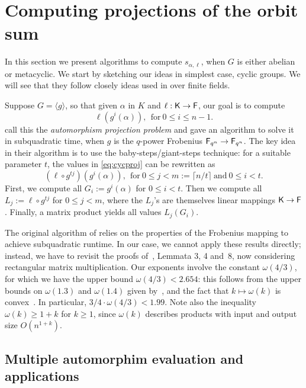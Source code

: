 \section{Computing projections of the orbit sum}
\label{sec:osum}

In this section we present algorithms to compute $s_{\alpha,\ell}$,
when $G$ is either abelian or metacyclic. We start by sketching our
ideas in simplest case, cyclic groups.  We will see that they follow
closely ideas used in \cite{KalSho98} over finite fields.

Suppose $G = \langle g \rangle$, so that given $\alpha$ in $K$ and
$\ell: {\mathsf{K}} \to {\mathsf{F}}$, our goal is to compute
\begin{equation}
  \label{eq:cycproj}
  \ell(g^i(\alpha)), ~~\mbox{for}~ 0\leq i\leq n-1.
\end{equation}
 call this the \emph{automorphism projection problem} and
gave an algorithm to solve it in subquadratic time, when $g$ is the
$q$-power Frobenius ${\mathsf{F}}_{q^n} \to {\mathsf{F}}_{q^n}$.  The key idea in their
algorithm is to use the baby-steps/giant-steps technique: for a suitable
parameter $t$, the values in \eqref{eq:cycproj} can be rewritten as
\[
  (\ell \circ g^{tj})(g^i(\alpha)), ~~\mbox{for}~ 0 \leq j < m:=\lceil n/t
  \rceil ~\mbox{and}~ 0 \leq i <t.
\]
First, we compute all $G_i:=g^i(\alpha)$ for $0 \leq i <t$.  Then we compute
all $L_j:=\ell \circ g^{tj}$ for $0 \leq j <m$, where the $L_j$'s are
themselves linear mappings ${\mathsf{K}} \to {\mathsf{F}}$.  Finally, a matrix product yields
all values $L_j(G_i)$.
 
The original algorithm of  relies on the properties of the
Frobenius mapping to achieve subquadratic runtime. In our case, we cannot
apply these results directly; instead, we have to revisit the proofs
of~, Lemmata 3, 4 and~8, now considering rectangular matrix
multiplication.  Our exponents involve the constant $\omega(4/3)$, for
which we have the upper bound $\omega(4/3) < 2.654$: this follows from the
upper bounds on $\omega(1.3)$ and $\omega(1.4)$ given by~, and
the fact that $k \mapsto \omega(k)$ is convex~\cite{LoRo83}. In particular,
$3/4 \cdot \omega(4/3) < 1.99$. Note also the inequality
$\omega(k) \ge 1+k$ for $k\ge 1$, since $\omega(k)$ describes products with
input and output size $O(n^{1+k})$.


\subsection{Multiple automorphim evaluation and applications}

